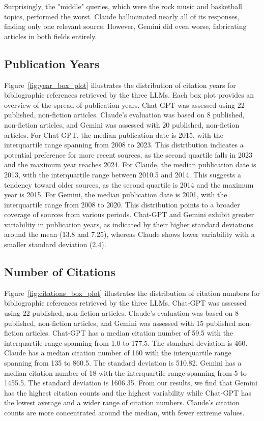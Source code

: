 \documentclass[runningheads]{llncs}
\begin{document}
Surprisingly, the "middle" queries, which were the rock music and basketball topics, performed the worst. Claude hallucinated nearly all of its responses, finding only one relevant source. However, Gemini did even worse, fabricating articles in both fields entirely. 

\subsection{Publication Years}

Figure~\ref{fig:year_box_plot} illustrates the distribution of citation years for bibliographic references retrieved by the three LLMs. Each box plot provides an overview of the spread of publication years.
Chat-GPT was assessed using 22 published, non-fiction articles. Claude's evaluation was based on 8 published, non-fiction articles, and Gemini was assessed with 20 published, non-fiction articles.
For Chat-GPT, the median publication date is 2015, with the interquartile range spanning from 2008 to 2023. This distribution indicates a potential preference for more recent sources, as the second quartile falls in 2023 and the maximum year reaches 2024.
For Claude, the median publication date is 2013, with the interquartile range between 2010.5 and 2014. This suggests a tendency toward older sources, as the second quartile is 2014 and the maximum year is 2015.
For Gemini, the median publication date is 2001, with the interquartile range from 2008 to 2020. This distribution points to a broader coverage of sources from various periods.
Chat-GPT and Gemini exhibit greater variability in publication years, as indicated by their higher standard deviations around the mean (13.8 and 7.25), whereas Claude shows lower variability with a smaller standard deviation (2.4).

\subsection{Number of Citations}

Figure~\ref{fig:citations_box_plot} illustrates the distribution of citation numbers for bibliographic references retrieved by the three LLMs.
Chat-GPT was assessed using 22 published, non-fiction articles. Claude's evaluation was based on 8 published, non-fiction articles, and Gemini was assessed with 15 published non-fiction articles.
Chat-GPT has a median citation number of 59.5 with the interquartile range spanning from 1.0 to 177.5. The standard deviation is 460.
Claude has a median citation number of 160 with the interquartile range spanning from 135 to 860.5. The standard deviation is 510.82.
Gemini has a median citation number of 18 with the interquartile range spanning from 5 to 1455.5. The standard deviation is 1606.35.
From our results, we find that Gemini has the highest citation counts and the highest variability while Chat-GPT has the lowest average and a wider range of citation numbers.
Claude's citation counts are more concentrated around the median, with fewer extreme values.
\end{document}
